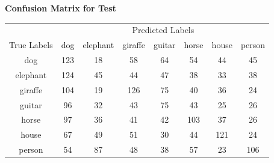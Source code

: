 \documentclass{article}
\begin{document}
\begin{center}
    \textbf{Confusion Matrix for Test}
    
    \begin{tabular}{c|ccccccc}
    \toprule
    & \multicolumn{7}{c}{Predicted Labels} \\
    \cmidrule(lr){2-8}
    True Labels & dog & elephant & giraffe & guitar & horse & house & person \\
    \midrule
    dog & 123 & 18 & 58 & 64 & 54 & 44 & 45 \\
    elephant & 124 & 45 & 44 & 47 & 38 & 33 & 38 \\
    giraffe & 104 & 19 & 126 & 75 & 40 & 36 & 24 \\
    guitar & 96 & 32 & 43 & 75 & 43 & 25 & 26 \\
    horse & 97 & 36 & 41 & 42 & 103 & 37 & 26 \\
    house & 67 & 49 & 51 & 30 & 44 & 121 & 24 \\
    person & 54 & 87 & 48 & 38 & 57 & 23 & 106 \\
    \bottomrule
    \end{tabular}
    \label{tab:confusion_matrix_test_aug}
\end{center}

        
    
\end{document}

